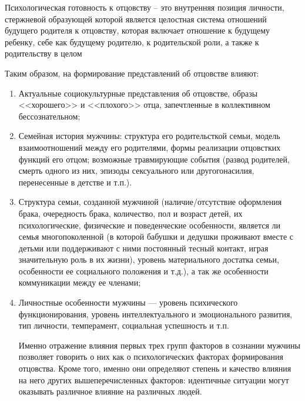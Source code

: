 \documentclass{../../common/thesisbyxetex}
\begin{document}
Психологическая готовность к отцовству – это внутренняя позиция личности,
стержневой образующей которой является целостная система отношений будущего
родителя к отцовству, которая включает отношение к будущему ребенку, себе как
будущему родителю, к родительской роли, а также к родительству в целом \cite[121]{har}

Таким образом, на формирование представлений об отцовстве влияют:

\begin{enumerate}
	\item Актуальные социокультурные представления об отцовстве, образы <<хорошего>> и <<плохого>>
отца, запечтленные в коллективном бессознательном;

    \item Семейная история мужчины: структура его родительсткой семьи,  модель взаимоотношений
между его родителями, формы реализации отцовстких функций его отцом; возможные травмирующие события
(развод родителей, смерть одного из них, эпизоды сексуального или другогонасилия, перенесенные в
детстве и т.п.).

	\item Структура семьи, созданной мужчиной (наличие/отсутствие оформления брака,
очередность брака, количество, пол и возраст детей, их психологические, физические и
поведенческие особенности, является ли семья многопоколенной (в которой бабушки и дедушки
проживают вместе с детьми или поддерживают с ними постоянный тесный контакт, играя
значительную роль в их жизни), уровень материального достатка семьи, особенности ее социального
положения и т.д.), а так же  особенности коммуникации между ее членами;

	\item Личностные особенности мужчины --- уровень психического функционирования,
уровень интеллектуального и эмоционального развития, тип личности, темперамент, социальная
успешность и т.п.

Именно отражение влияния первых трех групп факторов в сознании мужчины позволяет говорить о них как
о психологических факторах формирования отцовства. Кроме того, именно они определяют степень и
качество влияния на него других вышеперечисленных факторов: идентичные ситуации могут оказывать
различное влияние на различных людей.
\end{enumerate}
\end{document}
